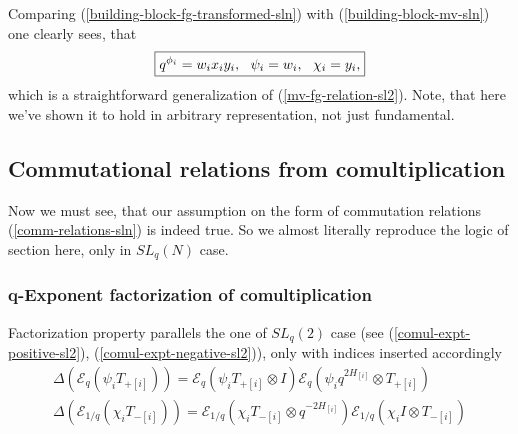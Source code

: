 \documentclass{article}
\newcommand{\lb}{\left (}
\newcommand{\rb}{\right )}
\newcommand{\B}[1]{\lb #1 \rb}
\newcommand{\lsb}{\left [}
\newcommand{\rsb}{\right ]}
\newcommand{\SB}[1]{\lsb #1 \rsb}
\newcommand {\?}{\textit{???}}
\newcommand{\me}[0]{\mathcal{E}}
\newcommand{\Tp}[1][]{T_{+ #1}}
\newcommand{\Tm}[1][]{T_{- #1}}
\newcommand{\leftFactor}[2]{#1[#2] \otimes I}
\newcommand{\rightFactor}[2]{I \otimes #1[#2]}
\newcommand{\leftTwistFactor}[2]{#1[#2] \otimes q^{-2H_{#2}}}
\newcommand{\rightTwistFactor}[2]{q^{2H_{#2}} \otimes #1[#2]}
\newcommand{\comul}[1]{\Delta \lb #1 \rb}
\newcommand{\delabel}[1]{(\ref{#1})}
\begin{document}
Comparing \delabel{building-block-fg-transformed-sln}
with \delabel{building-block-mv-sln} one clearly sees, that
\begin{equation}
  \boxed {
    \label{mv-fg-relation-sln}
    q^{\phi_i} = w_i x_i y_i, \ \ \psi_i = w_i,\ \ \chi_i = y_i,
  }
\end{equation}
which is a straightforward generalization of \delabel{mv-fg-relation-sl2}. Note, that here we've shown it
to hold in arbitrary representation, not just fundamental.

\subsection{Commutational relations from comultiplication}
Now we must see, that our assumption on the form of commutation relations
\delabel{comm-relations-sln} is indeed true.
So we almost literally reproduce the logic of section \label{comm-relations-dual-algebra-sl2} here,
only in $SL_q(N)$ case.

\subsubsection{q-Exponent factorization of comultiplication}
Factorization property parallels the one of $SL_q(2)$ case
(see \delabel{comul-expt-positive-sl2}, \delabel{comul-expt-negative-sl2}),
only with indices inserted accordingly
\begin{align}
\label{comul-expt-positive-sln}
\comul{\me_q \B{\psi_i \Tp[\SB{i}]}} =
\me_q \B{\psi_i \leftFactor{\Tp}{\SB{i}}}
\me_q \B{\psi_i \rightTwistFactor{\Tp}{\SB{i}}} \\
\label{comul-expt-negative-sln}
\comul{\me_{1/q} \B{\chi_i \Tm[\SB{i}]}} =
\me_{1/q} \B{\chi_i \leftTwistFactor{\Tm}{\SB{i}}}
\me_{1/q} \B{\chi_i \rightFactor{\Tm}{\SB{i}}}
\end{align}
\end{document}
